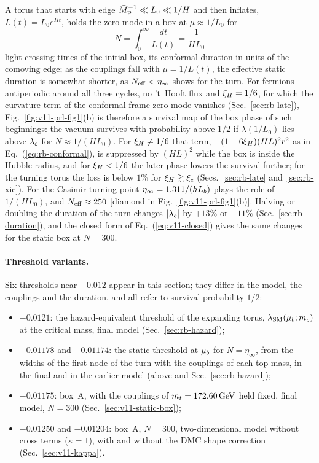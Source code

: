 A torus that starts with edge $\bar M_{\mathrm{P}}^{-1}\ll L_0\ll1/H$ and then inflates, $L(t)=L_0e^{Ht}$, holds the zero mode in a box at $\mu\approx1/L_0$ for
\begin{equation}
N=\int_0^\infty\frac{dt}{L(t)}=\frac{1}{HL_0}
\label{eq:v11-Ninfl}
\end{equation}
light-crossing times of the initial box, its conformal duration in units of the comoving edge; as the couplings fall with $\mu=1/L(t)$, the effective static duration is somewhat shorter, as $N_{\rm eff}<\eta_\infty$ shows for the turn.
For fermions antiperiodic around all three cycles, no 't~Hooft flux and $\xi_H=1/6$, for which the curvature term of the conformal-frame zero mode vanishes (Sec.~\ref{sec:rb-late}), Fig.~\ref{fig:v11-prl-fig1}(b) is therefore a survival map of the box phase of such beginnings: the vacuum survives with probability above $1/2$ if $\lambda(1/L_0)$ lies above $\lambda_c$ for $N\approx1/(HL_0)$.
For $\xi_H\neq1/6$ that term, $-(1-6\xi_H)(HL)^2r^2$ as in Eq.~(\ref{eq:rb-conformal}), is suppressed by $(HL)^2$ while the box is inside the Hubble radius, and for $\xi_H<1/6$ the later phase lowers the survival further; for the turning torus the loss is below $1\%$ for $\xi_H\gtrsim\xi_c$ (Secs.~\ref{sec:rb-late} and~\ref{sec:rb-xic}). %
For the Casimir turning point $\eta_\infty=1.311/(hL_b)$ plays the role of $1/(HL_0)$, and $N_{\rm eff}\approx250$ [diamond in Fig.~\ref{fig:v11-prl-fig1}(b)]. %
Halving or doubling the duration of the turn changes $|\lambda_c|$ by $+13\%$ or $-11\%$ (Sec.~\ref{sec:rb-duration}), and the closed form of Eq.~(\ref{eq:v11-closed}) gives the same changes for the static box at $N=300$. %

\paragraph{Threshold variants.}
Six thresholds near $-0.012$ appear in this section; they differ in the model, the couplings and the duration, and all refer to survival probability $1/2$:
\begin{itemize}
\item $-0.0121$: the hazard-equivalent threshold of the expanding torus, $\lambda_{\rm SM}(\mu_b;m_c)$ at the critical mass, final model (Sec.~\ref{sec:rb-hazard}); %
\item $-0.01178$ and $-0.01174$: the static threshold at $\mu_b$ for $N=\eta_\infty$, from the widths of the first node of the turn with the couplings of each top mass, in the final and in the earlier model (above and Sec.~\ref{sec:rb-hazard}); %
\item $-0.01175$: box~A, with the couplings of $m_t=172.60\,\mathrm{GeV}$ held fixed, final model, $N=300$ (Sec.~\ref{sec:v11-static-box}); %
\item $-0.01250$ and $-0.01204$: box~A, $N=300$, two-dimensional model without cross terms ($\kappa=1$), with and without the DMC shape correction (Sec.~\ref{sec:v11-kappa}). %
\end{itemize}

